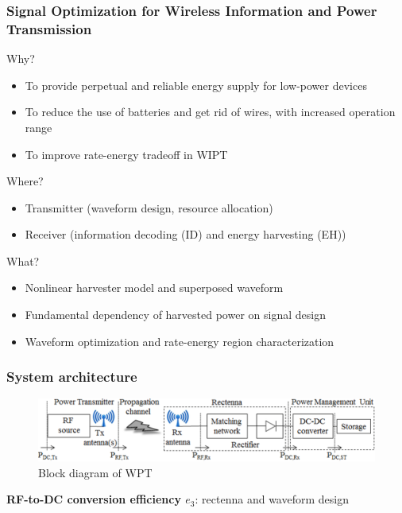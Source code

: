 \documentclass{beamer}
\begin{document}
\begin{frame}
\frametitle{Signal Optimization for Wireless Information and Power Transmission}

\begin{block}{Why?}
\begin{itemize}
  \item To provide perpetual and reliable energy supply for low-power devices
  \item To reduce the use of batteries and get rid of wires, with increased operation range
  \item To improve rate-energy tradeoff in WIPT
\end{itemize}
\end{block}

\begin{block}{Where?}
\begin{itemize}
  \item Transmitter (waveform design, resource allocation)
  \item Receiver (information decoding (ID) and energy harvesting (EH))
\end{itemize}
\end{block}

\begin{block}{What?}
\begin{itemize}
  \item Nonlinear harvester model and superposed waveform
  \item Fundamental dependency of harvested power on signal design
  \item Waveform optimization and rate-energy region characterization
\end{itemize}
\end{block}

\end{frame}


\begin{frame}
\frametitle{System architecture}

\begin{figure}
  \centering
    \includegraphics[width=\textwidth]{wpt_block_diagram}
  \caption{Block diagram of WPT \cite{Clerckx2018a}}
  \label{fig:wpt-block-diagram}
\end{figure}

\textbf{RF-to-DC conversion efficiency ${e_3}$}: \alert{rectenna} and \alert{waveform design}

\end{frame}
\end{document}
